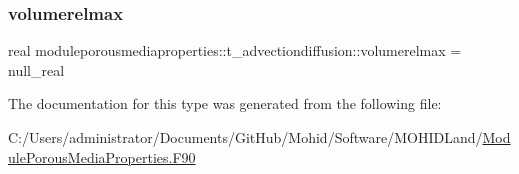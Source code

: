 \mbox{\label{structmoduleporousmediaproperties_1_1t__advectiondiffusion_afb1a524f0db8bdc7797f3241013c6496}} 
\subsubsection{\texorpdfstring{volumerelmax}{volumerelmax}}
{\footnotesize\ttfamily real moduleporousmediaproperties\+::t\+\_\+advectiondiffusion\+::volumerelmax = null\+\_\+real\hspace{0.3cm}{\ttfamily [private]}}



The documentation for this type was generated from the following file\+:\begin{DoxyCompactItemize}
\item 
C\+:/\+Users/administrator/\+Documents/\+Git\+Hub/\+Mohid/\+Software/\+M\+O\+H\+I\+D\+Land/\mbox{\hyperlink{_module_porous_media_properties_8_f90}{Module\+Porous\+Media\+Properties.\+F90}}\end{DoxyCompactItemize}

